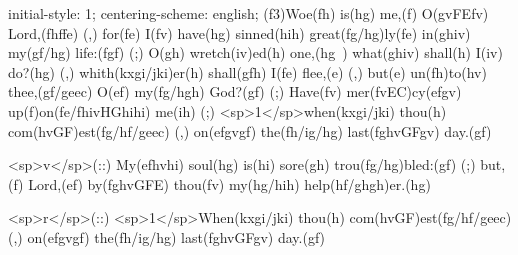 initial-style: 1;
centering-scheme: english;
(f3)Woe(fh) is(hg) me,(f) O(gvFEfv) Lord,(fhffe) (,) for(fe) I(fv) have(hg) sinned(hih) great(fg/hg)ly(fe) in(ghiv) my(gf/hg) life:(fgf) (;) O(gh) wretch(iv)ed(h) one,(hg~) what(ghiv) shall(h) I(iv) do?(hg) (,) whith(kxgi/jki)er(h) shall(gfh) I(fe) flee,(e) (,) but(e) un(fh)to(hv) thee,(gf/geec) O(ef) my(fg/hgh) God?(gf) (;) Have(fv) mer(fvEC)cy(efgv) up(f)on(fe/fhivHGhihi) me(ih) (;) <sp>1</sp>when(kxgi/jki) thou(h) com(hvGF)est(fg/hf/geec) (,) on(efgvgf) the(fh/ig/hg) last(fghvGFgv) day.(gf)

<sp>v</sp>(::) My(efhvhi) soul(hg) is(hi) sore(gh) trou(fg/hg)bled:(gf) (;) but,(f) Lord,(ef) by(fghvGFE) thou(fv) my(hg/hih) help(hf/ghgh)er.(hg)

<sp>r</sp>(::) <sp>1</sp>When(kxgi/jki) thou(h) com(hvGF)est(fg/hf/geec) (,) on(efgvgf) the(fh/ig/hg) last(fghvGFgv) day.(gf)